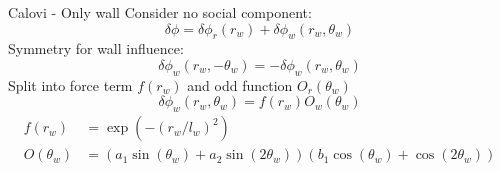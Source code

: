 \documentclass{beamer}
\begin{document}
\begin{frame}{Calovi - Only wall}
Consider no social component:
 \begin{equation}
  \label{eq:calovi-wall_model}
  \delta \phi = \delta \phi_r (r_w) + \delta \phi_w (r_w, \theta_w)
\end{equation}
Symmetry for wall influence:
\begin{equation}
  \label{eq:calovi-wall-symmetry}
   \delta \phi_w (r_w, -\theta_w) =  - \delta \phi_w (r_w, \theta_w)
\end{equation}
Split into force term $f(r_w)$ and odd function $O_r(\theta_w)$ 
\begin{equation}
  \label{eq:calovi-wall-split}
  \delta \phi_w (r_w, \theta_w) = f(r_w)O_w(\theta_w)
\end{equation}
\begin{align}
  \label{eq:calovi-wall-force}
  f(r_w) &= \exp\left( -{(r_w/l_w)}^2 \right) \\
  O(\theta_w) &= \left(a_1 \sin(\theta_w) + a_2 \sin(2  \theta_w)  \right)  \left( b_1  \cos(\theta_w) + \cos(2  \theta_w) \right)
\end{align}
\end{frame}
\end{document}
